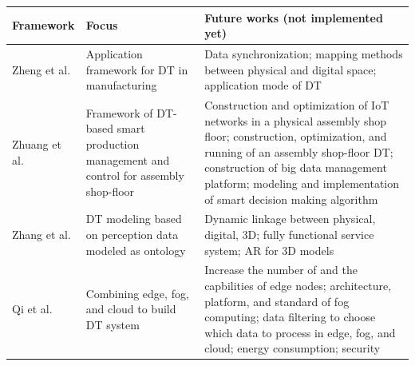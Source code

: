 \documentclass[article,table]{aaltoseries}
\begin{document}
\begin{table}[]
	\begin{tabular}{|l|p{4.5cm}|p{7.3cm}|}
		\hline
		\rowcolor[HTML]{C0C0C0} 
		Framework                                                                    & Focus                                                                                 & Future works (not implemented yet)                                                                                                                                                                                                                                  \\ \hline
		Zheng et al. \cite{zheng2019application}                                                         & Application framework for DT in manufacturing                                         & Data synchronization; mapping methods between physical and digital space; application mode of DT                                                                                                                                                                    \\ \hline
		Zhuang et al. \cite{Zhuang2018}                                                                   & Framework of DT-based smart production management and control for assembly shop-floor & Construction and optimization of IoT networks in a physical assembly shop floor; construction, optimization, and running of an assembly shop-floor DT; construction of big data management platform; modeling and implementation of smart decision making algorithm \\ \hline
		Zhang et al. \cite{Zhang2017}                                                                    & DT modeling based on perception data modeled as ontology                              & Dynamic linkage between physical, digital, 3D; fully functional service system; AR for 3D models                                                                                                                                                                    \\ \hline
		Qi et al. \cite{qi2018modeling}                                                               & Combining edge, fog, and cloud to build DT system                                     & Increase the number of and the capbilities of edge nodes; architecture, platform, and standard of fog computing; data filtering to choose which data to process in edge, fog, and cloud; energy consumption; security                                               \\ \hline

\end{tabular}
\end{table}
\end{document}
